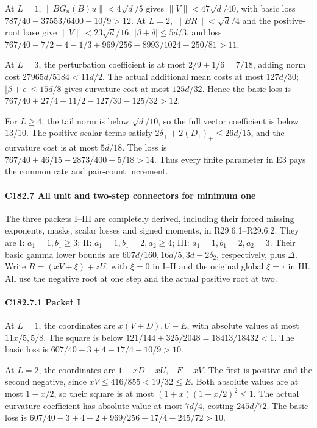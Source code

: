 At \(L=1\), \(\|BG_n(B)u\|<4\sqrt d/5\) gives \(\|V\|<47\sqrt d/40\), with basic loss \(787/40-37553/6400-10/9>12\). At \(L=2\), \(\|BR\|<\sqrt d/4\) and the positive-root base give \(\|V\|<23\sqrt d/16\), \(|\beta+\delta|\le5d/3\), and loss \(767/40-7/2+4-1/3+969/256-8993/1024-250/81>11\).

At \(L=3\), the perturbation coefficient is at most \(2/9+1/6=7/18\), adding norm cost \(27965d/5184<11d/2\). The actual additional mean costs at most \(127d/30\); \(|\beta+\epsilon|\le15d/8\) gives curvature cost at most \(125d/32\). Hence the basic loss is \(767/40+27/4-11/2-127/30-125/32>12\).

For \(L\ge4\), the tail norm is below \(\sqrt d/10\), so the full vector coefficient is below \(13/10\). The positive scalar terms satisfy \(2\delta_++2(D_1)_+\le26d/15\), and the curvature cost is at most \(5d/18\). The loss is \(767/40+46/15-2873/400-5/18>14\). Thus every finite parameter in E3 pays the common rate and pair-count increment.


\paragraph{C182.7 All unit and two-step connectors for minimum one}

The three packets I--III are completely derived, including their forced missing exponents, masks, scalar losses and signed moments, in R29.6.1--R29.6.2. They are I: \(a_1=1,\allowbreak \allowbreak  b_1\ge3\); II: \(a_1=1,\allowbreak \allowbreak  b_1=2,\allowbreak \allowbreak  a_2\ge4\); III: \(a_1=1,\allowbreak \allowbreak  b_1=2,\allowbreak \allowbreak  a_2=3\). Their basic gamma lower bounds are \(607d/160,\allowbreak \allowbreak  16d/5,\allowbreak \allowbreak  3d-2\delta_2\), respectively, plus \(\Delta\). Write \(R=(xV+\xi)+zU\), with \(\xi=0\) in I--II and the original global \(\xi=\tau\) in III. All use the negative root at one step and the actual positive root at two.

\paragraph{C182.7.1 Packet I}

At \(L=1\), the coordinates are \(x(V+D),\allowbreak \allowbreak  U-E\), with absolute values at most \(11x/5,\allowbreak \allowbreak  5/8\). The square is below \(121/144+325/2048=18413/18432<1\). The basic loss is \(607/40-3+4-17/4-10/9>10\).

At \(L=2\), the coordinates are \(1-xD-xU,\allowbreak \allowbreak -E+xV\). The first is positive and the second negative, since \(xV\le416/855<19/32\le E\). Both absolute values are at most \(1-x/2\), so their square is at most \((1+x)(1-x/2)^2\le1\). The actual curvature coefficient has absolute value at most \(7d/4\), costing \(245d/72\). The basic loss is \(607/40-3+4-2+969/256-17/4-245/72>10\).

